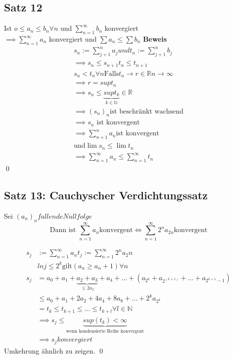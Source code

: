 \documentclass[fleqn]{scrbook}
\newcommand{\R}{\mathbb{R}}
\newcommand{\N}{\mathbb{N}}
\newcommand{\sumOI}{\sum_{n=1}^{\infty}}
\renewenvironment{proof}{{\bfseries Beweis }}{\qed}
\begin{document}
\subsection{Satz 12}
Ist $o \le a_n \le b_n \forall n$ und $\sum_{n=1}^{\infty} b_n$ konvergiert \\
$ \implies \sum_{n=1}^{\infty} a_n$ konvergiert und $ \sum a_n \le \sum b_n$
\begin{proof}
 \begin{equation}
  \begin{split}
    s_n := \sum_{j+1}^n a_j und t_n := \sum_{j+1}^n b_j \\
    \implies s_n \le s_{n+1} t_n \le t_{n+1} \\
    s_n < t_n \forall n 
    \text{Falls} t_n \to r \in \R n \to \infty \\
    \implies r = sup t_n \\
    \implies s_n \le \underbrace{sup t_k}_{k \in \N} \in \R \\
    \implies (s_n)_n \text{ist beschränkt wachsend} \\
    \implies s_n \text{ ist konvergent} \\
    \implies \sum_{n+1}^n a_n \text{ist konvergent} \\
    \text{und} \lim s_n \le \lim t_n \\
    \implies \sum_{n=1}^{\infty} a_n \le \sum_{n=1}^{\infty} t_n
   \end{split}
 \end{equation}
\end{proof}

\subsection{Satz 13: Cauchyscher Verdichtungssatz}
Sei $(a_n)_n fallende Nullfolge$
\begin{equation}
 \text{Dann ist } \sumOI a_n \text{konvergent} \Leftrightarrow \sumOI 2^n a_{2n} \text{konvergent}
\end{equation}

\begin{proof}
 \begin{equation}
  \begin{split}
   s_j & := \sumOI a_n t_j := \sumOI 2^n a_2n \\
   & ln  j \le 2^k \text{gilt} (a_n \ge a_n+1) \forall n \\
   s_j &= a_0 + a_1 + \underbrace{a_2 + a_3}_{\le 2a_2} + a_4 + \ldots + (a_{2^k} + a_{2^(k+1)} + \ldots + a_{2^{k+1}-1}) \\
   & \le a_0 + a_1 + 2a_2 + 4 a_4 + 8 a_8 + \ldots + 2^k a_{2^k} \\
   & =t_k \le t_{k+1} \le \ldots \le t_{k+l} \forall l \in \N \\
   & \implies s_j \le \underbrace{sup(t_k) < \infty}_{\text{wenn kondensierte Reihe konvergent}} \\
   & \implies s_j konvergiert
  \end{split}
 \end{equation}
Umkehrung ähnlich zu zeigen.
\end{proof}
\end{document}
